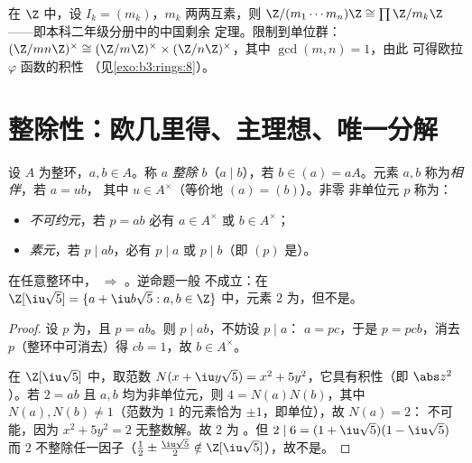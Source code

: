 \begin{example}\label{ex:b3:rings:crtz}
在 $\Z$ 中，设 $I_k = (m_k)$，$m_k$ 两两互素，则 $\Z/(m_1\cdots
m_n)\Z \cong \prod \Z/m_k\Z$——即本科二年级分册中的中国剩余
定理。限制到单位群：$(\Z/mn\Z)^\times \cong
(\Z/m\Z)^\times \times (\Z/n\Z)^\times$，其中 $\gcd(m,n)=1$，由此
可得欧拉 $\varphi$ 函数的积性
（见\cref{exo:b3:rings:8}）。
\end{example}

\section{整除性：欧几里得、主理想、唯一分解}

\begin{definition}\label{def:b3:rings:divisibility}
设 $A$ 为整环，$a, b \in A$。称 $a$
\emph{整除} $b$（$a \mid b$），若 $b \in (a) = aA$。元素 $a,
b$ 称为\emph{相伴}，若 $a = ub$，
其中 $u \in A^\times$（等价地 $(a) = (b)$）。非零
非单位元 $p$ 称为：
\begin{itemize}
  \item \emph{不可约元}，若 $p = ab$
        必有 $a \in A^\times$ 或 $b \in A^\times$；
  \item \emph{素元}，若 $p \mid ab$，必有 $p
        \mid a$ 或 $p \mid b$（即 $(p)$ 是）。
\end{itemize}
\end{definition}

\begin{proposition}\label{prop:b3:rings:primeirred}
在任意整环中， $\Rightarrow$ 。逆命题一般
不成立：在 $\Z[\iu\sqrt 5] = \{a + \iu b\sqrt5 : a, b
\in \Z\}$ 中，元素 $2$ 为，但不是。
\end{proposition}

\begin{proof}
设 $p$ 为，且 $p = ab$。则 $p \mid ab$，不妨设 $p \mid a$：
$a = pc$，于是 $p = pcb$，消去 $p$（整环中可消去）得 $cb =
1$，故 $b \in A^\times$。

在 $\Z[\iu\sqrt5]$ 中，取范数 $N(x + \iu y\sqrt 5) = x^2 +
5y^2$，它具有积性（即 $\abs z^2$）。若 $2 = ab$
且 $a, b$ 均为非单位元，则 $4 = N(a)N(b)$，其中 $N(a), N(b) \neq
1$（范数为 $1$ 的元素恰为 $\pm1$，即单位），故 $N(a) = 2$：
不可能，因为 $x^2 + 5y^2 = 2$ 无整数解。故 $2$ 为
。但 $2 \mid 6 = (1 + \iu\sqrt5)(1 - \iu\sqrt5)$
而 $2$ 不整除任一因子（$\frac12 \pm \frac{\iu\sqrt5}2
\notin \Z[\iu\sqrt5]$），故不是。
\end{proof}

